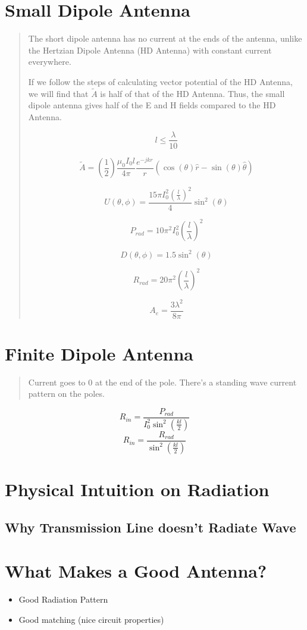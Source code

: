 \documentclass{article} %
\begin{document}
\section{Small Dipole Antenna}

\begin{quote}
    The short dipole antenna has no current at the ends of the antenna, unlike the Hertzian Dipole Antenna (HD Antenna) with constant current everywhere.

    If we follow the steps of calculating vector potential of the HD Antenna, we will find that $\tilde{A}$ is half of that of the HD Antenna. Thus, the small dipole antenna gives half of the E and H fields compared to the HD Antenna.

    \[l \leq \frac{\lambda}{10}\]

    \[\tilde{A} = \left(\frac{1}{2}\right)\frac{\mu_0 I_0 l}{4 \pi}\frac{e^{-jkr}}{r}(\cos(\theta) \hat{r} -\sin(\theta) \hat{\theta})\]

    \[U(\theta, \phi) = \frac{15 \pi I_0 ^2\left(\frac{l}{\lambda}\right)^2}{4} \sin^2(\theta)\]

    \[P_{rad} = 10 \pi^2 I_0^2 \left(\frac{l}{\lambda}\right)^2\]

    \[D(\theta, \phi) = 1.5 \sin^2(\theta)\]

    \[R_{rad} = 20 \pi^2 \left(\frac{l}{\lambda}\right)^2\]

    \[A_e = \frac{3 \lambda ^2}{8 \pi}\]
\end{quote}

\section{Finite Dipole Antenna}
\begin{quote}
    Current goes to 0 at the end of the pole. There's a standing wave current pattern on the poles.
\end{quote}


\[R_{in} = \frac{P_{rad}}{I_0^2 \sin^2\left(\frac{kl}{2}\right)}\]
\[R_{in} = \frac{R_{rad}}{\sin^2\left(\frac{kl}{2}\right)}\]

\section{Physical Intuition on Radiation}
\subsection{Why Transmission Line doesn't Radiate Wave}


\section{What Makes a Good Antenna?}
\begin{itemize}
    \item Good Radiation Pattern
    \item Good matching (nice circuit properties)
\end{itemize}
\end{document}
